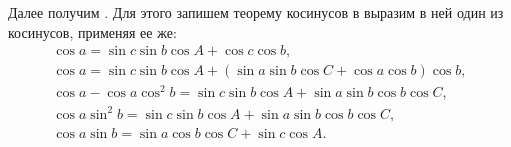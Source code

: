 Далее получим . Для этого запишем теорему косинусов в выразим в ней один из косинусов, применяя ее же:
\begin{gather}
    \cos a = \sin c \sin b \cos A + \cos c \cos b,\nonumber\\
    \cos a = \sin c \sin b \cos A + \left( \sin a \sin b \cos C + \cos a \cos b \right)\cos b,\nonumber\\
    \cos a - \cos a \cos^2 b = \sin c \sin b \cos A + \sin a \sin b \cos b \cos C,\nonumber\\
    \cos a \sin^2 b = \sin c \sin b \cos A + \sin a \sin b \cos b \cos C,\nonumber\\
    \cos a \sin b = \sin a \cos b \cos C + \sin c \cos A.
    \label{eq:formula-5-elem}
\end{gather}


